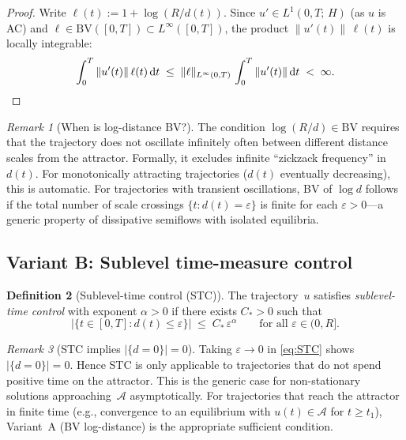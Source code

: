 \documentclass[12pt,a4paper]{article}
\theoremstyle{definition}
\newtheorem{definition}{Definition}[section]
\theoremstyle{plain}
\theoremstyle{remark}
\newtheorem{remark}[definition]{Remark}
\newcommand{\BV}{\mathrm{BV}}
\begin{document}
\begin{proof}
Write $\ell(t) := 1 + \log(R/d(t))$.  Since $u' \in L^1(0,T;\,H)$
(as $u$ is AC) and $\ell \in \BV([0,T]) \subset
L^\infty([0,T])$, the product
$\|u'(t)\|\,\ell(t)$ is locally integrable:
\[
  \int_0^T \|u'(t)\|\,\ell(t)\,\mathrm{d}t
  \;\le\;
  \|\ell\|_{L^\infty(0,T)}\,\int_0^T \|u'(t)\|\,\mathrm{d}t
  \;<\; \infty.  \qedhere
\]
\end{proof}

\begin{remark}[When is log-distance BV?]
\label{rem:log-BV}
The condition $\log(R/d) \in \BV$ requires that the trajectory
does not oscillate infinitely often between different distance
scales from the attractor.  Formally, it excludes infinite
``zickzack frequency'' in $d(t)$.  For monotonically attracting
trajectories ($d(t)$ eventually decreasing), this is automatic.
For trajectories with transient oscillations, BV of $\log d$
follows if the total number of scale crossings
$\{t : d(t) = \varepsilon\}$ is finite for each
$\varepsilon > 0$---a generic property of dissipative semiflows
with isolated equilibria.
\end{remark}

\subsection{Variant B: Sublevel time-measure control}

\begin{definition}[Sublevel-time control (STC)]
\label{def:STC}
The trajectory~$u$ satisfies \emph{sublevel-time control} with
exponent $\alpha > 0$ if there exists $C_* > 0$ such that
\begin{equation}\label{eq:STC}
  \bigl|\{t \in [0,T] : d(t) \le \varepsilon\}\bigr|
  \;\le\;
  C_*\,\varepsilon^\alpha
  \qquad \text{for all } \varepsilon \in (0, R].
\end{equation}
\end{definition}

\begin{remark}[STC implies \texorpdfstring{$|\{d=0\}| = 0$}{measure of d=0 is zero}]
\label{rem:STC-d0}
Taking $\varepsilon \to 0$ in \eqref{eq:STC} shows
$|\{d = 0\}| = 0$.  Hence STC is only applicable to
trajectories that do not spend positive time on the attractor.
This is the generic case for non-stationary solutions
approaching~$\mathcal{A}$ asymptotically.  For trajectories
that reach the attractor in finite time (e.g., convergence
to an equilibrium with $u(t) \in \mathcal{A}$ for
$t \ge t_1$), Variant~A (BV log-distance) is the appropriate
sufficient condition.
\end{remark}
\end{document}
